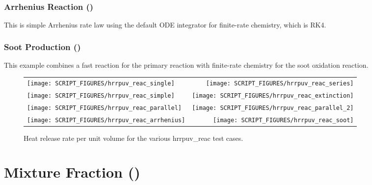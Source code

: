 \documentclass[11pt]{book}
\begin{document}
\subsubsection{Arrhenius Reaction ()} This is simple Arrhenius rate law using the default ODE integrator for finite-rate chemistry, which is RK4.

\subsubsection{Soot Production ()} This example combines a fast reaction for the primary reaction with finite-rate chemistry for the soot oxidation reaction.


\begin{figure}[p]
\begin{tabular*}{\textwidth}{lr}
\texttt{[image: SCRIPT\_FIGURES/hrrpuv\_reac\_single]} &
\texttt{[image: SCRIPT\_FIGURES/hrrpuv\_reac\_series]} \\
\texttt{[image: SCRIPT\_FIGURES/hrrpuv\_reac\_simple]} &
\texttt{[image: SCRIPT\_FIGURES/hrrpuv\_reac\_extinction]} \\
\texttt{[image: SCRIPT\_FIGURES/hrrpuv\_reac\_parallel]} &
\texttt{[image: SCRIPT\_FIGURES/hrrpuv\_reac\_parallel\_2]} \\
\texttt{[image: SCRIPT\_FIGURES/hrrpuv\_reac\_arrhenius]} &
\texttt{[image: SCRIPT\_FIGURES/hrrpuv\_reac\_soot]}
\end{tabular*}
\caption[Results of the {\ct hrrpuv\_reac} test cases]{Heat release rate per unit volume for the various {\ct hrrpuv\_reac} test cases.}
\label{hrrpuv_reac_figures}
\end{figure}


\clearpage

\section{Mixture Fraction ()}
\label{Mix_Frac}
\label{burke_schumann_spec}
\label{burke_schumann_temp}
\end{document}
